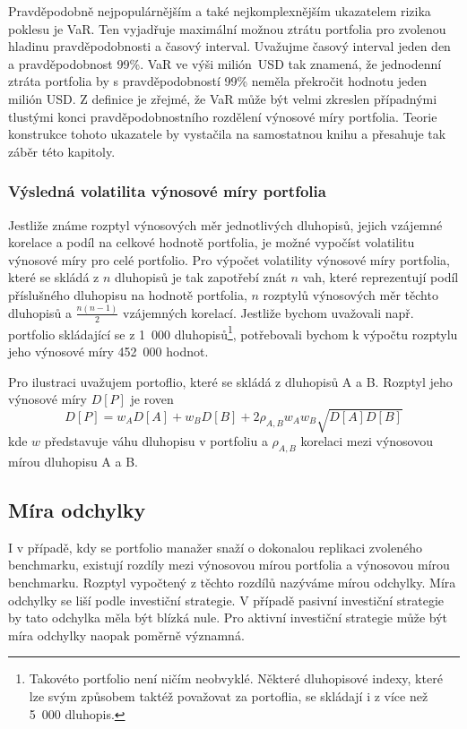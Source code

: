 \documentclass[a4paper]{book}
\begin{document}
Pravděpodobně nejpopulárnějším a také nejkomplexnějším ukazatelem rizika poklesu je VaR. Ten vyjadřuje maximální možnou ztrátu portfolia pro zvolenou hladinu pravděpodobnosti a časový interval. Uvažujme časový interval jeden den a pravděpodobnost 99\%. VaR ve výši milión~USD tak znamená, že jednodenní ztráta portfolia by s pravděpodobností 99\% neměla překročit hodnotu jeden milión USD. Z definice je zřejmé, že VaR může být velmi zkreslen případnými tlustými konci pravděpodobnostního rozdělení výnosové míry portfolia. Teorie konstrukce tohoto ukazatele by vystačila na samostatnou knihu a přesahuje tak záběr této kapitoly.

\subsubsection{Výsledná volatilita výnosové míry portfolia}

Jestliže známe rozptyl výnosových měr jednotlivých dluhopisů, jejich vzájemné korelace a podíl na celkové hodnotě portfolia, je možné vypočíst volatilitu výnosové míry pro celé portfolio. Pro výpočet volatility výnosové míry portfolia, které se skládá z $n$ dluhopisů je tak zapotřebí znát $n$ vah, které reprezentují podíl příslušného dluhopisu na hodnotě portfolia, $n$ rozptylů výnosových měr těchto dluhopisů a $\frac{n(n-1)}{2}$ vzájemných korelací. Jestliže bychom uvažovali např. portfolio skládající se z 1~000 dluhopisů\footnote{Takovéto portfolio není ničím neobvyklé. Některé dluhopisové indexy, které lze svým způsobem taktéž považovat za portoflia, se skládají i z více než 5~000 dluhopis.}, potřebovali bychom k výpočtu rozptylu jeho výnosové míry 452~000 hodnot.

Pro ilustraci uvažujem portoflio, které se skládá z dluhopisů A a B. Rozptyl jeho výnosové míry $D[P]$ je roven
\begin{equation*}
D[P] = w_A D[A] + w_B D[B] + 2 \rho_{A,B} w_A w_B \sqrt{D[A]D[B]}
\end{equation*}
kde $w$ představuje váhu dluhopisu v portfoliu a $\rho_{A,B}$ korelaci mezi výnosovou mírou dluhopisu A a B.

\subsection{Míra odchylky}

I v případě, kdy se portfolio manažer snaží o dokonalou replikaci zvoleného benchmarku, existují rozdíly mezi výnosovou mírou portfolia a výnosovou mírou benchmarku. Rozptyl vypočtený z těchto rozdílů nazýváme mírou odchylky. Míra odchylky se liší podle investiční strategie. V případě pasivní investiční strategie by tato odchylka měla být blízká nule. Pro aktivní investiční strategie může být míra odchylky naopak poměrně významná.
\end{document}
